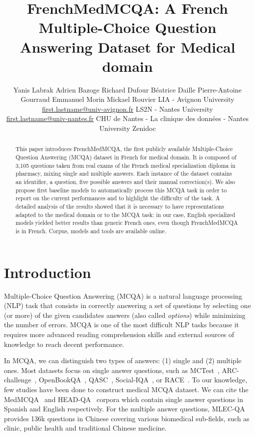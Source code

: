 \documentclass[11pt]{article}
\title{FrenchMedMCQA: A French Multiple-Choice Question Answering Dataset for Medical domain}
\author{
Yanis Labrak
\And Adrien Bazoge
\And Richard Dufour
\And Béatrice Daille
\AND Pierre-Antoine Gourraud
\And Emmanuel Morin
\And Mickael Rouvier
\AND \textnormal{\large LIA - Avignon University}\\\normalsize{\url{first.lastname@univ-avignon.fr}}
\And \textnormal{\large LS2N - Nantes University}\\\normalsize{\url{first.lastname@univ-nantes.fr}}
\AND \textnormal{\large CHU de Nantes - La clinique des données - Nantes University}
\And \textnormal{\large Zenidoc }\\
}
\begin{document}
\maketitle
\begin{abstract}
This paper introduces FrenchMedMCQA, the first publicly available Multiple-Choice Question Answering (MCQA) dataset in French for medical domain. It is composed of 3,105 questions taken from real exams of the French medical specialization diploma in pharmacy, mixing  single  and multiple answers.
Each instance of the dataset contains an identifier, a question, five possible answers and their manual correction(s). 
We also propose first baseline models to automatically process this MCQA task in order to report on the current performances and to highlight the difficulty of the task. A detailed analysis of the results showed that it is necessary to have representations adapted to the medical domain or to the MCQA task: in our case, English specialized models yielded better results than generic French ones, even though FrenchMedMCQA is in French. Corpus, models and tools are available online.
\end{abstract}

\section{Introduction}









Multiple-Choice Question Answering (MCQA) is a natural language processing (NLP) task that consists in correctly answering a set of questions by selecting one (or more) of the given  candidates answers (also called {\it options}) while minimizing the number of errors. MCQA is one of the most difficult NLP tasks because it requires more advanced reading comprehension skills and external sources of knowledge to reach decent performance.



In MCQA, we can distinguish two types of answers: (1) single and (2) multiple ones. Most datasets focus on single answer questions, such as MCTest~\cite{richardson-etal-2013-mctest}, ARC-challenge~\cite{Clark2018ThinkYH}, OpenBookQA~\cite{OpenBookQA2018}, QASC~\cite{https://doi.org/10.48550/arxiv.1910.11473}, Social-IQA~\cite{https://doi.org/10.48550/arxiv.1904.09728}, or RACE~\cite{lai-etal-2017-race}.
To our knowledge, few studies have been done to construct medical MCQA dataset. We can cite the MedMCQA~\cite{pmlr-v174-pal22a} and HEAD-QA~\cite{vilares-gomez-rodriguez-2019-head} corpora which contain single answer questions in Spanish and English respectively. For the multiple answer questions, MLEC-QA~\cite{li-etal-2021-mlec} provides 136k questions in Chinese covering various biomedical sub-fields, such as clinic, public health and traditional Chinese medicine.
\end{document}
